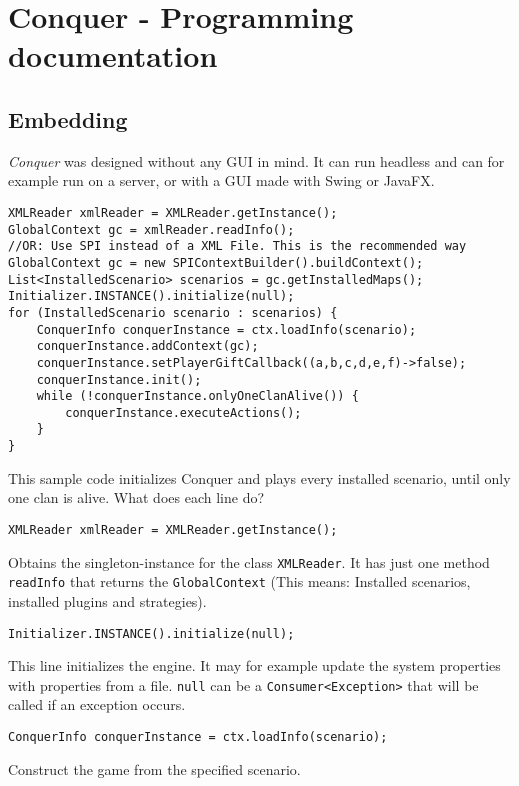 \documentclass{article}
\begin{document}
    \tableofcontents
    \newpage


    \section{Conquer - Programming documentation}

    \subsection{Embedding}
    \textit{Conquer} was designed without any GUI in mind. It can run headless and can for example run on a server, or with a GUI made with Swing or JavaFX.
    \begin{verbatim}
XMLReader xmlReader = XMLReader.getInstance();
GlobalContext gc = xmlReader.readInfo();
//OR: Use SPI instead of a XML File. This is the recommended way
GlobalContext gc = new SPIContextBuilder().buildContext();
List<InstalledScenario> scenarios = gc.getInstalledMaps();
Initializer.INSTANCE().initialize(null);
for (InstalledScenario scenario : scenarios) {
	ConquerInfo conquerInstance = ctx.loadInfo(scenario);
	conquerInstance.addContext(gc);
	conquerInstance.setPlayerGiftCallback((a,b,c,d,e,f)->false);
	conquerInstance.init();
	while (!conquerInstance.onlyOneClanAlive()) {
		conquerInstance.executeActions();
	}
}
    \end{verbatim}
    This sample code initializes Conquer and plays every installed scenario, until only one clan is alive.\newline
    What does each line do?\newline
    \begin{verbatim}
XMLReader xmlReader = XMLReader.getInstance();
    \end{verbatim}
    Obtains the singleton-instance for the class \texttt{XMLReader}. It has just one method \texttt{readInfo} that returns the \texttt{GlobalContext} (This means: Installed scenarios,
    installed plugins and strategies).
    \begin{verbatim}
Initializer.INSTANCE().initialize(null);
    \end{verbatim}
    This line initializes the engine. It may for example update the system properties with properties from a file. \texttt{null} can be a \texttt{Consumer<Exception>} that will be called if an exception
    occurs.
    \begin{verbatim}
ConquerInfo conquerInstance = ctx.loadInfo(scenario);
    \end{verbatim}
    Construct the game from the specified scenario.
\end{document}
